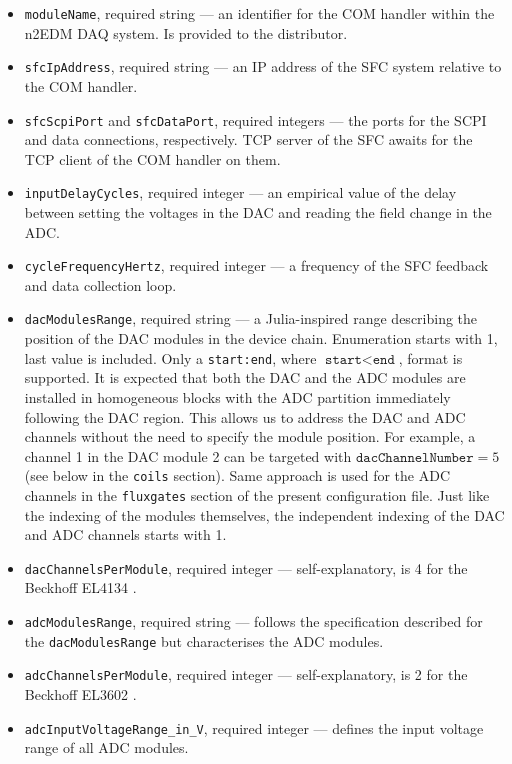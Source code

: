 \begin{itemize}
	\item \texttt{moduleName}, required string --- an identifier for the COM handler within the n2EDM DAQ system. Is provided to the distributor.
	\item \texttt{sfcIpAddress}, required string --- an IP address of the SFC system relative to the COM handler.
	\item \texttt{sfcScpiPort} and \texttt{sfcDataPort}, required integers --- the ports for the SCPI and data connections, respectively. TCP server of the SFC awaits for the TCP client of the COM handler on them.
	\item \texttt{inputDelayCycles}, required integer --- an empirical value of the delay between setting the voltages in the DAC and reading the field change in the ADC.
	\item \texttt{cycleFrequencyHertz}, required integer --- a frequency of the SFC feedback and data collection loop.
	\item \texttt{dacModulesRange}, required string --- a Julia-inspired \cite{Juliacontributors} range describing the position of the DAC modules in the device chain. Enumeration starts with 1, last value is included. Only a \texttt{start:end}, where $\texttt{start} < \texttt{end}$, format is supported. It is expected that both the DAC and the ADC modules are installed in homogeneous blocks with the ADC partition immediately following the DAC region. This allows us to address the DAC and ADC channels without the need to specify the module position. For example, a channel 1 in the DAC module 2 can be targeted with $\texttt{dacChannelNumber} = 5$ (see below in the \texttt{coils} section). Same approach is used for the ADC channels in the \texttt{fluxgates} section of the present configuration file. Just like the indexing of the modules themselves, the independent indexing of the DAC and ADC channels starts with 1.
	\item \texttt{dacChannelsPerModule}, required integer --- self-explanatory, is 4 for the Beckhoff EL4134 \cite{BeckhoffDAC2019}.
	\item \texttt{adcModulesRange}, required string --- follows the specification described for the \texttt{dacModulesRange} but characterises the ADC modules. 
	\item \texttt{adcChannelsPerModule}, required integer --- self-explanatory, is 2 for the Beckhoff EL3602 \cite{BeckhoffADC2019}.
	\item \texttt{adcInputVoltageRange\_in\_V}, required integer --- defines the input voltage range of all ADC modules.

\end{itemize}
